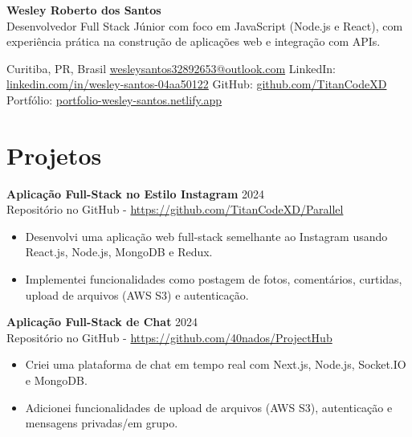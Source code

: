 \documentclass[a4paper, 10pt]{article}
\begin{document}
\begin{center}
    {\Huge \textbf{Wesley Roberto dos Santos}} \\
    \vspace{0.3em}
    \small{Desenvolvedor Full Stack Júnior com foco em JavaScript (Node.js e React), com experiência prática na construção de aplicações web e integração com APIs.}

    \vspace{0.6em}
    Curitiba, PR, Brasil \quad\textbullet\quad 
    \href{mailto:wesleysantos32892653@outlook.com}{wesleysantos32892653@outlook.com} \quad\textbullet\quad
    LinkedIn: \href{https://www.linkedin.com/in/wesley-santos-04aa50122}{linkedin.com/in/wesley-santos-04aa50122} \quad\textbullet\quad
    GitHub: \href{https://github.com/TitanCodeXD}{github.com/TitanCodeXD} \quad\textbullet\quad
    Portfólio: \href{https://portfolio-wesley-santos.netlify.app}{portfolio-wesley-santos.netlify.app}
\end{center}

\section{Projetos}
\textbf{Aplicação Full-Stack no Estilo Instagram} \hfill 2024 \\
 Repositório no GitHub - \href{https://github.com/TitanCodeXD/Parallel}{https://github.com/TitanCodeXD/Parallel}
\begin{itemize}
    \item Desenvolvi uma aplicação web full-stack semelhante ao Instagram usando React.js, Node.js, MongoDB e Redux.
    \item Implementei funcionalidades como postagem de fotos, comentários, curtidas, upload de arquivos (AWS S3) e autenticação.
\end{itemize}

\medskip
\textbf{Aplicação Full-Stack de Chat} \hfill 2024 \\
Repositório no GitHub - \href{https://github.com/40nados/ProjectHub}{https://github.com/40nados/ProjectHub}
\begin{itemize}
    \item Criei uma plataforma de chat em tempo real com Next.js, Node.js, Socket.IO e MongoDB.
    \item Adicionei funcionalidades de upload de arquivos (AWS S3), autenticação e mensagens privadas/em grupo.
\end{itemize}
\end{document}
